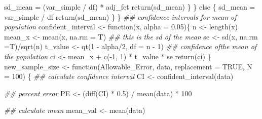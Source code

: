 \documentclass[
  letterpaper,
]{book}
\newenvironment{Shaded}{\begin{snugshade}}{\end{snugshade}}
\newcommand{\AttributeTok}[1]{\textcolor[rgb]{0.40,0.45,0.13}{#1}}
\newcommand{\ConstantTok}[1]{\textcolor[rgb]{0.56,0.35,0.01}{#1}}
\newcommand{\ControlFlowTok}[1]{\textcolor[rgb]{0.00,0.23,0.31}{#1}}
\newcommand{\DecValTok}[1]{\textcolor[rgb]{0.68,0.00,0.00}{#1}}
\newcommand{\DocumentationTok}[1]{\textcolor[rgb]{0.37,0.37,0.37}{\textit{#1}}}
\newcommand{\FloatTok}[1]{\textcolor[rgb]{0.68,0.00,0.00}{#1}}
\newcommand{\FunctionTok}[1]{\textcolor[rgb]{0.28,0.35,0.67}{#1}}
\newcommand{\NormalTok}[1]{\textcolor[rgb]{0.00,0.23,0.31}{#1}}
\newcommand{\OtherTok}[1]{\textcolor[rgb]{0.00,0.23,0.31}{#1}}
\newcommand{\SpecialCharTok}[1]{\textcolor[rgb]{0.37,0.37,0.37}{#1}}
\begin{document}
\begin{Shaded}
\begin{Highlighting}[]
\NormalTok{      sd\_mean }\OtherTok{=}\NormalTok{ (var\_simple }\SpecialCharTok{/}\NormalTok{ df) }\SpecialCharTok{*}\NormalTok{ adj\_fct}
      \FunctionTok{return}\NormalTok{(sd\_mean)}
\NormalTok{    \}}
\NormalTok{  \}}
  \ControlFlowTok{else}\NormalTok{ \{}
\NormalTok{    sd\_mean }\OtherTok{=}\NormalTok{ var\_simple }\SpecialCharTok{/}\NormalTok{ df}
    \FunctionTok{return}\NormalTok{(sd\_mean)}
\NormalTok{  \}}
\NormalTok{\}}
\DocumentationTok{\#\# confidence intervals for mean of population}
\NormalTok{confident\_interval }\OtherTok{\textless{}{-}} \ControlFlowTok{function}\NormalTok{(x, }\AttributeTok{alpha =} \FloatTok{0.05}\NormalTok{)\{}
\NormalTok{  n }\OtherTok{\textless{}{-}} \FunctionTok{length}\NormalTok{(x)}
\NormalTok{  mean\_x }\OtherTok{\textless{}{-}} \FunctionTok{mean}\NormalTok{(x, }\AttributeTok{na.rm =}\NormalTok{ T)}
  \DocumentationTok{\#\# this is the sd of the mean }
\NormalTok{  se }\OtherTok{\textless{}{-}} \FunctionTok{sd}\NormalTok{(x, }\AttributeTok{na.rm =}\NormalTok{T)}\SpecialCharTok{/}\FunctionTok{sqrt}\NormalTok{(n)}
\NormalTok{  t\_value }\OtherTok{\textless{}{-}} \FunctionTok{qt}\NormalTok{(}\DecValTok{1} \SpecialCharTok{{-}}\NormalTok{ alpha}\SpecialCharTok{/}\DecValTok{2}\NormalTok{, }\AttributeTok{df =}\NormalTok{ n }\SpecialCharTok{{-}} \DecValTok{1}\NormalTok{)}
  \DocumentationTok{\#\# confidence ofthe mean of the population}
\NormalTok{  ci }\OtherTok{\textless{}{-}}\NormalTok{ mean\_x }\SpecialCharTok{+} \FunctionTok{c}\NormalTok{(}\SpecialCharTok{{-}}\DecValTok{1}\NormalTok{, }\DecValTok{1}\NormalTok{) }\SpecialCharTok{*}\NormalTok{ t\_value }\SpecialCharTok{*}\NormalTok{ se}
  \FunctionTok{return}\NormalTok{(ci)}
\NormalTok{\}}
\NormalTok{new\_sample\_size }\OtherTok{\textless{}{-}} \ControlFlowTok{function}\NormalTok{(Allowable\_Error, }
\NormalTok{                            data,}
                            \AttributeTok{replacement =} \ConstantTok{TRUE}\NormalTok{,}
                            \AttributeTok{N =} \DecValTok{100}\NormalTok{) \{}
  \DocumentationTok{\#\# calculate confidence interval }
\NormalTok{  CI }\OtherTok{\textless{}{-}} \FunctionTok{confident\_interval}\NormalTok{(data)}
  
  \DocumentationTok{\#\# percent error }
\NormalTok{  PE }\OtherTok{\textless{}{-}}\NormalTok{ (}\FunctionTok{diff}\NormalTok{(CI) }\SpecialCharTok{*} \FloatTok{0.5}\NormalTok{) }\SpecialCharTok{/} \FunctionTok{mean}\NormalTok{(data) }\SpecialCharTok{*} \DecValTok{100}
  
  \DocumentationTok{\#\# calculate mean}
\NormalTok{  mean\_val }\OtherTok{\textless{}{-}} \FunctionTok{mean}\NormalTok{(data)}


\end{Highlighting}
\end{Shaded}
\end{document}
